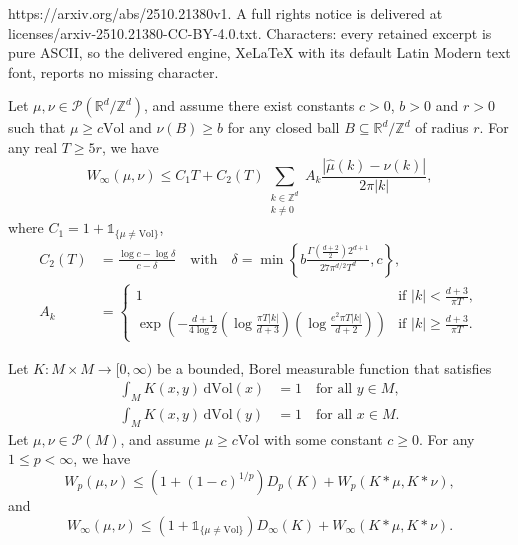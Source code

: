 \documentclass[10pt,a4paper]{amsart}
\begin{document}
https://arxiv.org/abs/2510.21380v1. A full rights notice is delivered at licenses/arxiv-2510.21380-CC-BY-4.0.txt. Characters: every retained excerpt is pure ASCII, so the delivered engine, XeLaTeX with its default Latin Modern text font, reports no missing character.
\begin{thm}\label{torusinfinitytheorem} Let $\mu, \nu \in \mathcal{P}(\mathbb{R}^d / \mathbb{Z}^d)$, and assume there exist constants $c>0$, $b>0$ and $r>0$ such that $\mu \ge c \mathrm{Vol}$ and $\nu (B) \ge b$ for any closed ball $B \subseteq \mathbb{R}^d / \mathbb{Z}^d$ of radius $r$. For any real $T \ge 5r$, we have
\[ W_{\infty}(\mu, \nu) \le C_1 T + C_2(T) \sum_{\substack{k \in \mathbb{Z}^d \\ k \neq 0}} A_k \frac{|\widehat{\mu}(k) - \widehat{\nu}(k)|}{2 \pi |k|}, \]
where $C_1 = 1+\mathds{1}_{\{ \mu \neq \mathrm{Vol} \}}$,
\[ \begin{split} C_2(T) &= \frac{\log c - \log \delta}{c-\delta} \quad \textrm{with} \quad \delta= \min \left\{ b \frac{\Gamma \left(\frac{d+2}{2} \right) 2^{d+1}}{27 \pi^{d/2} T^d}, c\right\}, \\ A_k &= \left\{ \begin{array}{ll} 1 & \textrm{if } |k| < \frac{d+3}{\pi T}, \\ \displaystyle{\exp \left( - \frac{d+1}{4 \log 2} \left( \log \frac{\pi T |k|}{d+3} \right) \left( \log \frac{e^2 \pi T |k|}{d+2} \right) \right)} & \textrm{if } |k| \ge \frac{d+3}{\pi T} . \end{array} \right. \end{split} \]
\end{thm}

\begin{lem}\label{smoothinglemma} Let $K: M \times M \to [0,\infty)$ be a bounded, Borel measurable function that satisfies
\[ \begin{split} \int_M K(x,y) \, \mathrm{d}\mathrm{Vol}(x) &= 1 \quad \textrm{for all } y \in M, \\ \int_M K(x,y) \, \mathrm{d}\mathrm{Vol}(y) &= 1 \quad \textrm{for all } x \in M . \end{split} \]
Let $\mu, \nu \in \mathcal{P}(M)$, and assume $\mu \ge c \mathrm{Vol}$ with some constant $c \ge 0$. For any $1 \le p < \infty$, we have
\[ W_p (\mu, \nu) \le (1+(1-c)^{1/p}) D_p (K) + W_p (K*\mu, K*\nu) , \]
and
\[ W_{\infty} (\mu, \nu) \le (1+\mathds{1}_{\{ \mu \neq \mathrm{Vol} \}}) D_{\infty} (K) + W_{\infty} (K*\mu, K*\nu) . \]
\end{lem}
\end{document}
